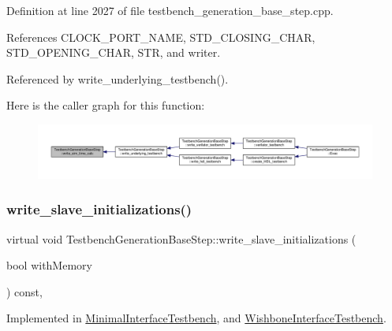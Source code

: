 Definition at line 2027 of file testbench\+\_\+generation\+\_\+base\+\_\+step.\+cpp.



References C\+L\+O\+C\+K\+\_\+\+P\+O\+R\+T\+\_\+\+N\+A\+ME, S\+T\+D\+\_\+\+C\+L\+O\+S\+I\+N\+G\+\_\+\+C\+H\+AR, S\+T\+D\+\_\+\+O\+P\+E\+N\+I\+N\+G\+\_\+\+C\+H\+AR, S\+TR, and writer.



Referenced by write\+\_\+underlying\+\_\+testbench().

Here is the caller graph for this function\+:
\nopagebreak
\begin{figure}[H]
\begin{center}
\leavevmode
\includegraphics[width=350pt]{dc/d02/classTestbenchGenerationBaseStep_a26f47a71a80495e7ee72fd5d56a0d647_icgraph}
\end{center}
\end{figure}
\mbox{\label{classTestbenchGenerationBaseStep_ae67ccd4b5e09cbd14bd2218330161d3e}} 
\subsubsection{\texorpdfstring{write\+\_\+slave\+\_\+initializations()}{write\_slave\_initializations()}}
{\footnotesize\ttfamily virtual void Testbench\+Generation\+Base\+Step\+::write\+\_\+slave\+\_\+initializations (\begin{DoxyParamCaption}\item[{bool}]{with\+Memory }\end{DoxyParamCaption}) const\hspace{0.3cm}{\ttfamily [protected]}, {}}



Implemented in \hyperlink{classMinimalInterfaceTestbench_a1bf1863909ba155e241745c78f6e3c03}{Minimal\+Interface\+Testbench}, and \hyperlink{classWishboneInterfaceTestbench_ae87e0398c62bdaa30f68d492a07e7cdc}{Wishbone\+Interface\+Testbench}.




